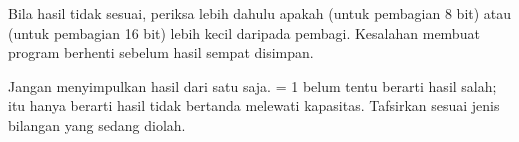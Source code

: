 \begin{infobox}
\vspace{1.1em}
Bila hasil  tidak sesuai, periksa lebih dahulu apakah
 (untuk pembagian 8 bit) atau  (untuk pembagian
16 bit) lebih kecil daripada pembagi. Kesalahan  membuat program berhenti sebelum hasil sempat disimpan.
\end{infobox}

\begin{peringatanbox}
\vspace{1.1em}
Jangan menyimpulkan hasil dari satu  saja.  = 1
belum tentu berarti hasil salah; itu hanya berarti hasil tidak
bertanda melewati kapasitas. Tafsirkan  sesuai jenis
bilangan yang sedang diolah.
\end{peringatanbox}
